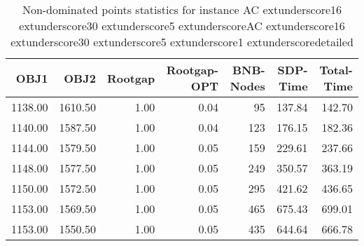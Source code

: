 \begin{table}
\caption{Non-dominated points statistics for instance AC	extunderscore16	extunderscore30	extunderscore5	extunderscoreAC	extunderscore16	extunderscore30	extunderscore5	extunderscore1	extunderscoredetailed}
\label{tab:stats/AC_16_30_5_AC_16_30_5_1_detailed}
\begin{tabular}{rrrrrrr}
\toprule
OBJ1 & OBJ2 & Rootgap & Rootgap-OPT & BNB-Nodes & SDP-Time & Total-Time \\
\midrule
1138.00 & 1610.50 & 1.00 & 0.04 & 95 & 137.84 & 142.70 \\
1140.00 & 1587.50 & 1.00 & 0.04 & 123 & 176.15 & 182.36 \\
1144.00 & 1579.50 & 1.00 & 0.05 & 159 & 229.61 & 237.66 \\
1148.00 & 1577.50 & 1.00 & 0.05 & 249 & 350.57 & 363.19 \\
1150.00 & 1572.50 & 1.00 & 0.05 & 295 & 421.62 & 436.65 \\
1153.00 & 1569.50 & 1.00 & 0.05 & 465 & 675.43 & 699.01 \\
1153.00 & 1550.50 & 1.00 & 0.05 & 435 & 644.64 & 666.78 \\
\bottomrule
\end{tabular}
\end{table}

